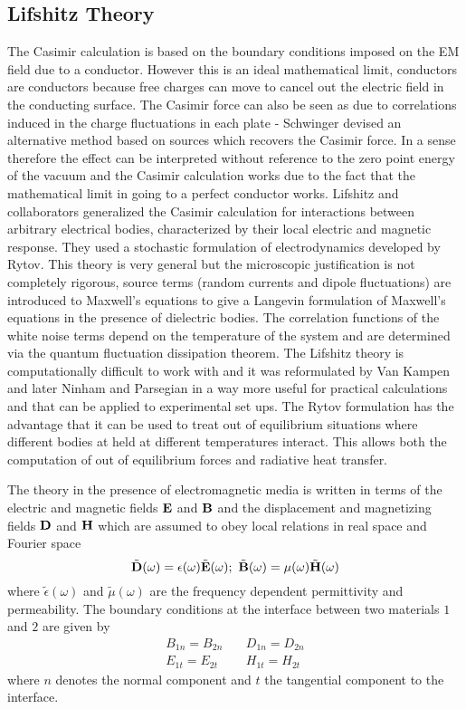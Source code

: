\subsection{Lifshitz Theory}

The Casimir calculation is based on the boundary conditions imposed on the EM field 
due to a conductor. However this is an ideal mathematical limit, conductors are conductors because free charges can move to cancel out the electric field in the conducting surface.
The Casimir force can also be seen as due to correlations induced in the charge fluctuations in each plate - Schwinger devised an alternative method based on sources which recovers the Casimir force. In a sense therefore the effect can be interpreted without reference to
the zero point energy of the vacuum and the Casimir calculation works due to the fact that the mathematical limit in going to a perfect conductor works. Lifshitz and collaborators 
generalized the Casimir calculation for interactions between arbitrary electrical bodies, characterized by their local electric and magnetic response. They used a stochastic formulation of electrodynamics developed by Rytov. This theory is very general but the microscopic justification is not completely rigorous, source terms (random currents and 
dipole fluctuations) are introduced to Maxwell's equations to give a Langevin formulation
of Maxwell's equations in the presence of dielectric bodies. The correlation functions of
the white noise terms depend on the temperature of the system and are determined via the 
quantum fluctuation dissipation theorem. The Lifshitz theory is computationally difficult to work with and it was reformulated by Van Kampen and later Ninham and Parsegian in a 
way more useful for practical calculations and that can be applied to experimental set ups.
The Rytov formulation has the advantage that it can be used to treat out of equilibrium situations where different bodies at held at different temperatures interact. This allows both the  computation of out of equilibrium forces and radiative  heat transfer. 

The theory in the presence of electromagnetic media is written in terms of the electric and magnetic fields ${\bf E}$ and ${\bf B}$ and the displacement and magnetizing fields ${\bf D}$ and ${\bf H}$ which are assumed to obey local relations in real space and Fourier space
\begin{equation}
    \tilde {\bf D}(\omega)=\epsilon(\omega)\tilde{\bf E}(\omega); \ \tilde {\bf B}(\omega)= \mu(\omega) \tilde{\bf H}(\omega)
\end{equation}
where $\tilde\epsilon( \omega)$ and $\tilde\mu( \omega)$ are the frequency dependent
permittivity and permeability. The boundary conditions at the interface between two materials $1$ and $2$ are given by
\begin{eqnarray}
B_{1n}= B_{2n} && \ D_{1n}=D_{2n} \\
E_{1t} = E_{2t}  && \ H_{1t}=H_{2t}
\end{eqnarray}
where $n$ denotes the normal component and $t$ the tangential component to the interface.

